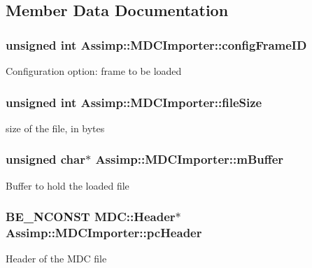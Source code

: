 \subsection{Member Data Documentation}
\hypertarget{class_assimp_1_1_m_d_c_importer_a12a986484855fa908e7ae3be9285a3bc}{
\subsubsection[{config\+Frame\+I\+D}]{\setlength{\rightskip}{0pt plus 5cm}unsigned int Assimp\+::\+M\+D\+C\+Importer\+::config\+Frame\+I\+D\hspace{0.3cm}{\ttfamily [protected]}}}\label{class_assimp_1_1_m_d_c_importer_a12a986484855fa908e7ae3be9285a3bc}
Configuration option\+: frame to be loaded \hypertarget{class_assimp_1_1_m_d_c_importer_a6dc66434e9ce2ba2e426929e5c685937}{
\subsubsection[{file\+Size}]{\setlength{\rightskip}{0pt plus 5cm}unsigned int Assimp\+::\+M\+D\+C\+Importer\+::file\+Size\hspace{0.3cm}{\ttfamily [protected]}}}\label{class_assimp_1_1_m_d_c_importer_a6dc66434e9ce2ba2e426929e5c685937}
size of the file, in bytes \hypertarget{class_assimp_1_1_m_d_c_importer_a1d66f033b340ecbc5661203bc5f90f09}{
\subsubsection[{m\+Buffer}]{\setlength{\rightskip}{0pt plus 5cm}unsigned char$\ast$ Assimp\+::\+M\+D\+C\+Importer\+::m\+Buffer\hspace{0.3cm}{\ttfamily [protected]}}}\label{class_assimp_1_1_m_d_c_importer_a1d66f033b340ecbc5661203bc5f90f09}
Buffer to hold the loaded file \hypertarget{class_assimp_1_1_m_d_c_importer_a7b77ed92c0de855c2194438bed591fe0}{
\subsubsection[{pc\+Header}]{\setlength{\rightskip}{0pt plus 5cm}B\+E\+\_\+\+N\+C\+O\+N\+S\+T {\bf M\+D\+C\+::\+Header}$\ast$ Assimp\+::\+M\+D\+C\+Importer\+::pc\+Header\hspace{0.3cm}{\ttfamily [protected]}}}\label{class_assimp_1_1_m_d_c_importer_a7b77ed92c0de855c2194438bed591fe0}
Header of the M\+D\+C file 

